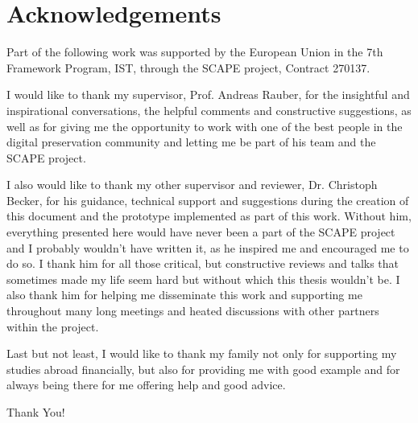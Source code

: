 \chapter*{Acknowledgements}
Part of the following  work was supported by the European Union in the 7th Framework Program, IST, through the SCAPE project, Contract 270137. \newline\newline

I would like to thank my supervisor, Prof. Andreas Rauber, for the insightful and inspirational conversations, the helpful comments and constructive suggestions, as well as for giving me the opportunity to work with one of the best people in the digital preservation community and letting me be part of his team and the SCAPE project.

I also would like to thank my other supervisor and reviewer, Dr. Christoph Becker, for his guidance, technical support and suggestions during the creation of this document and the prototype implemented as part of this work. Without him, everything presented here would have never been a part of the SCAPE project and I probably wouldn't have written it, as he inspired me and encouraged me to do so. I thank him for all those critical, but constructive reviews and talks that sometimes made my life seem hard but without which this thesis wouldn't be. I also thank him for helping me disseminate this work and supporting me throughout many long meetings and heated discussions with other partners within the project.

Last but not least, I would like to thank my family not only for supporting my studies abroad financially, but also for providing me with good example and for always being there for me offering help and good advice.\newline\newline

Thank You!